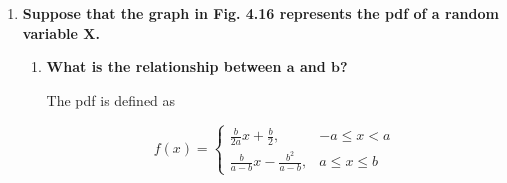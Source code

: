 \documentclass[10pt, oneside]{article}   	%
\theoremstyle{definition}
\begin{document}
\begin{enumerate}[label=4.\arabic*]
\begin{enumerate}
	\item  \begin{tcolorbox}[
	  colback=Cerulean!5!white,
	  colframe=Cerulean!75!black]
	\textbf{Show that for every number $\bm{\beta}$, $\bm{0 < \beta < 1, \beta f(x) + (1- \beta)g(x)}$ is a pdf on that interval.}
	\end{tcolorbox}
	
	\begin{proof}
	(1) By premise, $f(x), g(x) \geq 0$. Then $\beta f(x), (1 - \beta)g(x) \geq 0$ since $0 < \beta < 1$. \\
	(2) \begin{align*}
	\int ( \beta f(x) + (1- \beta)g(x) ) dx &= \int \beta f(x) dx + \int (1 - \beta) g(x) dx \\
	&= \beta \int f(x) dx + (1 - \beta) \int g(x) dx \\
	&= \beta + 1 - \beta = 1
	\end{align*}
	(3) By premise, $\int^b_a f(x) dx$ and $\int^b_a g(x) dx$ exist. For any $(a,b), a, b \in (-\infty, + \infty)$, it follows that
	\begin{align*}
	\beta \int^b_a  f(x) dx + (1 - \beta) \int^b_a  g(x) dx &= \int^b_a \beta f(x) dx + \int^b_a (1-\beta) g(x) dx \\
	&= \int^b_a ( \beta f(x) + (1- \beta)g(x) ) dx
	\end{align*}
	\end{proof}
	
	\end{enumerate}

\item  \begin{tcolorbox}[
  colback=Cerulean!5!white,
  colframe=Cerulean!75!black]
\textbf{Suppose that the graph in Fig. 4.16 represents the pdf of a random variable $\bm{X}$.}
\end{tcolorbox}

	\begin{enumerate}
	\item  \begin{tcolorbox}[
	  colback=Cerulean!5!white,
	  colframe=Cerulean!75!black]
	\textbf{What is the relationship between $\bm{a}$ and $\bm{b}$?}
	\end{tcolorbox}
	
	The pdf is defined as
	
	\[f(x) = \begin{cases}
  \frac{b}{2a}x + \frac{b}{2},  &  -a \leq x < a \\
  \frac{b}{a-b} x - \frac{b^2}{a - b}, & a \leq x \leq b
\end{cases} \]


\end{enumerate}
\end{enumerate}
\end{document}
